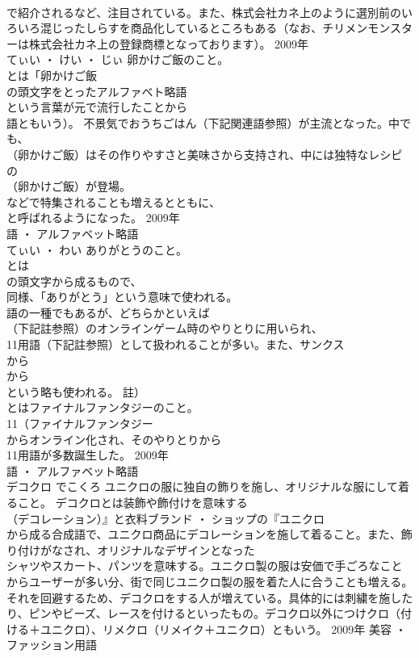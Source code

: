 \documentclass[8pt]{extreport}
\begin{document}
\begin{CJK}{UTF8}{min}
\\	で紹介されるなど、注目されている。また、株式会社カネ上のように選別前のいろいろ混じったしらすを商品化しているところもある（なお、チリメンモンスターは株式会社カネ上の登録商標となっております）。	2009年	
\\	てぃい ・ けい ・ じぃ	卵かけご飯のこと。	
\\	とは「卵かけご飯
\\	の頭文字をとったアルファベト略語
\\	という言葉が元で流行したことから
\\	語ともいう）。 不景気でおうちごはん（下記関連語参照）が主流となった。中でも、
\\	（卵かけご飯）はその作りやすさと美味さから支持され、中には独特なレシピの
\\	（卵かけご飯）が登場。
\\	などで特集されることも増えるとともに、
\\	と呼ばれるようになった。	2009年	
\\	語 ・ アルファベット略語	
\\	てぃい ・ わい	ありがとうのこと。	
\\	とは
\\	の頭文字から成るもので、
\\	同様、「ありがとう」という意味で使われる。
\\	語の一種でもあるが、どちらかといえば
\\	（下記註参照）のオンラインゲーム時のやりとりに用いられ、
\\	11用語（下記註参照）として扱われることが多い。また、サンクス
\\	から
\\	から
\\	という略も使われる。 註）
\\	とはファイナルファンタジーのこと。
\\	11（ファイナルファンタジー
\\	からオンライン化され、そのやりとりから
\\	11用語が多数誕生した。	2009年	
\\	語 ・ アルファベット略語	
\\	デコクロ	でこくろ	ユニクロの服に独自の飾りを施し、オリジナルな服にして着ること。	デコクロとは装飾や飾付けを意味する
\\	（デコレーション）』と衣料ブランド ・ ショップの『ユニクロ
\\	から成る合成語で、ユニクロ商品にデコレーションを施して着ること。また、飾り付けがなされ、オリジナルなデザインとなった
\\	シャツやスカート、パンツを意味する。ユニクロ製の服は安価で手ごろなことからユーザーが多い分、街で同じユニクロ製の服を着た人に合うことも増える。それを回避するため、デコクロをする人が増えている。具体的には刺繍を施したり、ピンやビーズ、レースを付けるといったもの。デコクロ以外につけクロ（付ける＋ユニクロ）、リメクロ（リメイク＋ユニクロ）ともいう。	2009年	美容 ・ ファッション用語	

\end{CJK}
\end{document}
